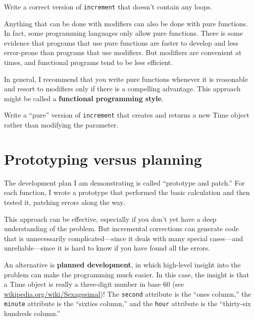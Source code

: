 \documentclass[10pt]{book}
\begin{document}
\begin{ex}
Write a correct version of {\tt increment} that
doesn't contain any loops.
\end{ex}

Anything that can be done with modifiers can also be done with pure
functions.  In fact, some programming languages only allow pure
functions.  There is some evidence that programs that use pure
functions are faster to develop and less error-prone than programs
that use modifiers.  But modifiers are convenient at times,
and functional programs tend to be less efficient.

In general, I recommend that you write pure functions whenever it is
reasonable and resort to modifiers only if there is a compelling
advantage.  This approach might be called a {\bf functional
programming style}.



\begin{ex}
Write a ``pure'' version of {\tt increment} that creates and returns
a new Time object rather than modifying the parameter.
\end{ex}


\section{Prototyping versus planning}
\label{prototype}


The development plan I am demonstrating is called ``prototype and
patch.''  For each function, I wrote a prototype that performed the
basic calculation and then tested it, patching errors along the
way.

This approach can be effective, especially if you don't yet have a
deep understanding of the problem.  But incremental corrections can
generate code that is unnecessarily complicated---since it deals with
many special cases---and unreliable---since it is hard to know if you
have found all the errors.

An alternative is {\bf planned development}, in which high-level
insight into the problem can make the programming much easier.  In
this case, the insight is that a Time object is really a three-digit
number in base 60 (see \url{wikipedia.org/wiki/Sexagesimal})!  The
{\tt second} attribute is the ``ones column,'' the {\tt minute}
attribute is the ``sixties column,'' and the {\tt hour} attribute is
the ``thirty-six hundreds column.''
\end{document}
